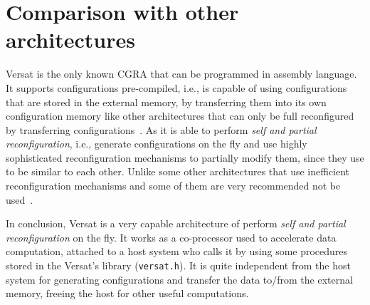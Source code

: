 \section{Comparison with other architectures}
\label{section:progComparisonWOtherArchitectures}

Versat is the only known CGRA that can be programmed in assembly
language. It supports configurations pre-compiled, i.e., is capable of
using configurations that are stored in the external memory, by
transferring them into its own configuration memory like other
architectures that can only be full reconfigured by transferring
configurations~\cite{Lee00,Mei05,Hartenstein99}. As it is able to
perform {\em self and partial reconfiguration}, i.e., generate
configurations on the fly and use highly sophisticated reconfiguration
mechanisms to partially modify them, since they use to be similar to
each other. Unlike some other architectures that use inefficient
reconfiguration mechanisms and some of them are very recommended not
be used~\cite{Ebeling96,Weinhardt03,Liu15}.

In conclusion, Versat is a very capable architecture of perform {\em
  self and partial reconfiguration} on the fly. It works as a
co-processor used to accelerate data computation, attached to a host
system who calls it by using some procedures stored in the Versat's
library ({\tt versat.h}). It is quite independent from the host system
for generating configurations and transfer the data to/from the
external memory, freeing the host for other useful computations.
